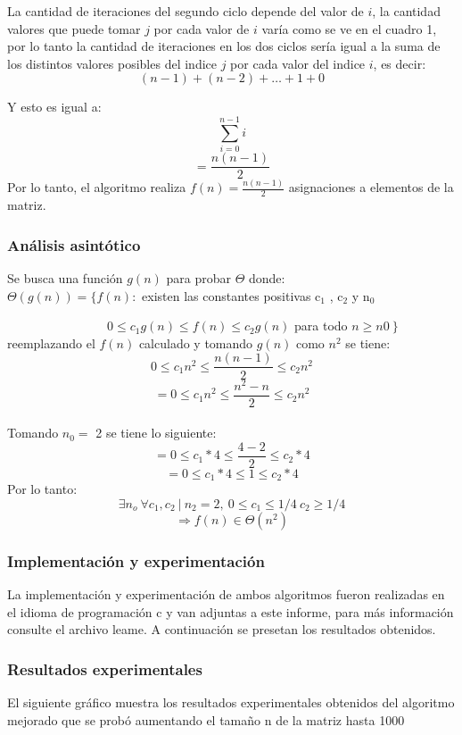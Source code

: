 \documentclass[11pt]{article}
\begin{document}
La cantidad de iteraciones del segundo ciclo depende del valor de \(i\), la cantidad valores que puede tomar \(j\) por cada valor de \(i\) varía como se ve en el cuadro 1, por lo tanto la cantidad de iteraciones en los dos ciclos sería igual a la suma de los distintos valores posibles del indice \(j\) por cada valor del indice \(i\), es decir: \[(n-1)+(n-2)+ \dots +1+0\]

Y esto es igual a:
\[\sum_{i=0}^{n-1}  i\]
\[= \frac{n(n-1)}{2} \]
Por lo tanto, el algoritmo realiza \(f(n) = \frac{n(n-1)}{2}\) asignaciones a elementos de la matriz.
 \clearpage
\subsubsection{Análisis asintótico}
Se busca una función \(g(n)\) para probar $\Theta$ donde:\\

\( \Theta (g(n))  =  \{ f (n) :\) existen las constantes positivas c$_1$ , c$_2$ y n$_0$ 

\ \ \ \ \ \ \ \ \ \ \ \ \ \ \ \ \(0\leq  c_1 g (n) \leq f (n) \leq c_2 g (n)\) para todo \( n \geq n0 \ \}  \)\\

reemplazando el \(f(n)\) calculado y tomando \(g(n)\) como \(n^2\) se tiene:
\[0 \leq  c_1 n^2 \leq \frac{n(n-1)}{2} \leq c_2 n^2\]
\[= 0 \leq  c_1 n^2 \leq \frac{n^2-n}{2} \leq c_2 n^2\]\\

Tomando \(n_0 = \) 2 se tiene lo siguiente:
\[= 0 \leq  c_1 * 4 \leq \frac{4-2}{2} \leq c_2 * 4\]
\[= 0 \leq  c_1 * 4 \leq 1 \leq c_2 * 4\]
Por lo tanto:
\[ \exists n_o\  \forall c_1,c_2 \ | \ n_2 = 2,\ 0 \leq c_1 \leq 1/4 \ c_2 \geq 1/4 \]
\[\Rightarrow f(n) \in \Theta(n^2)\]
\subsubsection{Implementación y experimentación}
La implementación y experimentación de ambos algoritmos fueron realizadas en el idioma de programación c y van adjuntas a este informe, para más información consulte el archivo leame. A continuación se presetan los resultados obtenidos.
\clearpage
\subsubsection{Resultados experimentales}
El siguiente gráfico muestra los resultados experimentales obtenidos del algoritmo mejorado que se probó aumentando el tamaño n de la matriz hasta 1000 
\end{document}
